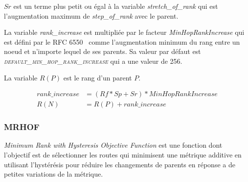         $Sr$ est un terme plus petit ou égal à la variable \textit{stretch\_of\_rank} qui est l'augmentation maximum de \textit{step\_of\_rank} avec le parent.


        La variable \textit{rank\_increase} est multipliée par le facteur \textit{MinHopRankIncrease} qui est défini par le RFC 6550~\cite{rfc:rpl} comme l'augmentation minimum du rang entre un noeud et n'importe lequel de ses parents. Sa valeur par défaut est \textsl{\textsc{default\_min\_hop\_rank\_increase}} qui a une valeur de 256.
        
        La variable $R(P)$ est le rang d'un parent $P$.

        \begin{equation}\label{eq:state-rankOF0}
            \begin{aligned}
                rank\_increase &= (Rf * Sp + Sr) * MinHopRankIncrease\\
                R(N) &= R(P) + rank\_increase    
            \end{aligned}
        \end{equation} 
                
    \subsubsection*{MRHOF}%
            \textit{Minimum Rank with Hysteresis Objective Function} est une fonction dont l'objectif est de sélectionner les routes qui minimisent une métrique additive en utilisant l'hystérésis
            pour réduire les changements de parents en réponse a de petites variations de la métrique.
            
